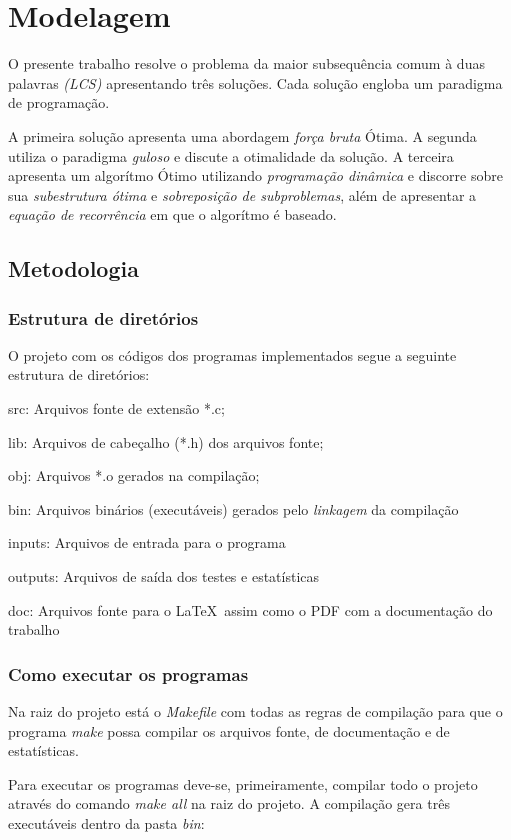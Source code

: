 \chapter{Modelagem}

O presente trabalho resolve o problema da maior subsequência comum à 
duas palavras \emph{(LCS)} apresentando três soluções. Cada solução 
engloba um paradigma de programação.

A primeira solução apresenta uma abordagem \emph{força bruta} Ótima. A 
segunda utiliza o paradigma \emph{guloso} e discute a otimalidade da 
solução. A terceira apresenta um algorítmo Ótimo utilizando 
\emph{programação dinâmica} e discorre sobre sua \emph{subestrutura 
ótima} e \emph{sobreposição de subproblemas}, além de apresentar a 
\emph{equação de recorrência} em que o algorítmo é baseado.

\section{Metodologia}

\subsection{Estrutura de diretórios}

O projeto com os códigos dos programas implementados segue a seguinte
estrutura de diretórios: 

src: Arquivos fonte de extensão *.c;

lib: Arquivos de cabeçalho (*.h) dos arquivos fonte;

obj: Arquivos *.o gerados na compilação;

bin: Arquivos binários (executáveis) gerados pelo {\it linkagem} 
da compilação

inputs: Arquivos de entrada para o programa

outputs: Arquivos de saída dos testes e estatísticas

doc: Arquivos fonte para o \LaTeX\ assim como o PDF com a documentação 
do trabalho

\subsection{Como executar os programas}
Na raiz do projeto está o {\it Makefile} com todas as regras de 
compilação para que o programa {\it make} possa compilar os arquivos
fonte, de documentação e de estatísticas. 

Para executar os programas deve-se, primeiramente, compilar todo o 
projeto através do comando \emph{make all} na raiz do projeto. 
A compilação gera três executáveis dentro da pasta {\it bin}:

